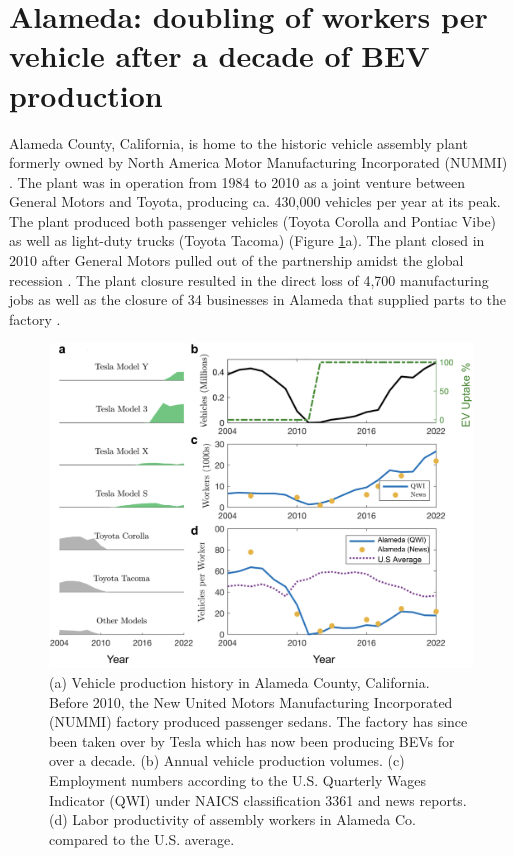 \documentclass[sn-mathphys,Numbered]{sn-jnl}%
\begin{document}
\section{Alameda: doubling of workers per vehicle after a decade of BEV production}

Alameda County, California, is home to the historic vehicle assembly plant formerly owned by North America Motor Manufacturing Incorporated (NUMMI) \cite{Austenfeld2007-db}. The plant was in operation from 1984 to 2010 as a joint venture between General Motors and Toyota, producing ca. 430,000 vehicles per year at its peak. The plant produced both passenger vehicles (Toyota Corolla and Pontiac Vibe) as well as light-duty trucks (Toyota Tacoma) (Figure \ref{fig:alameda}a). The plant closed in 2010 after General Motors pulled out of the partnership amidst the global recession \cite{Shaiken2010-bn, Troncoso2012-hv}. The plant closure resulted in the direct loss of 4,700 manufacturing jobs \cite{Shaiken2010-bn} as well as the closure of 34 businesses in Alameda that supplied parts to the factory \cite{Johnston2015-zh}. 

\begin{figure}[tp!]
\centering
\includegraphics[width=1.0\linewidth]{figures/fig_alameda.png}
\caption{(a) Vehicle production history in Alameda County, California. Before 2010, the New United Motors Manufacturing Incorporated (NUMMI) factory produced passenger sedans. The factory has since been taken over by Tesla which has now been producing BEVs for over a decade. (b) Annual vehicle production volumes. (c) Employment numbers according to the U.S. Quarterly Wages Indicator (QWI) under NAICS classification 3361 and news reports. (d) Labor productivity of assembly workers in Alameda Co. compared to the U.S. average.}
\label{fig:alameda}
\end{figure}
\end{document}
